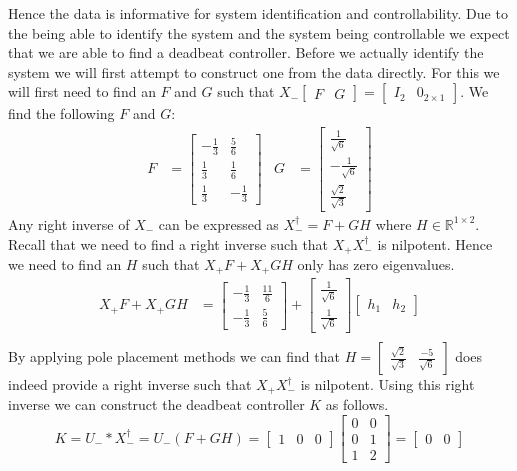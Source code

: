Hence the data is informative for system identification and controllability. Due to the being able to identify the system and the system being controllable we expect that we are able to find a deadbeat controller. Before we actually identify the system we will first attempt to construct one from the data directly. For this we will first need to find an $F$ and $G$ such that $X_- \begin{bmatrix}F&G\end{bmatrix} = \begin{bmatrix}I_2&0_{2\times 1}\end{bmatrix}$. We find the following $F$ and $G$:
\begin{align*}
F &= \begin{bmatrix}
	-\frac{1}{3} & \frac{5}{6} \\ \frac{1}{3} & \frac{1}{6} \\ \frac{1}{3} & -\frac{1}{3}
\end{bmatrix} &
G &= \begin{bmatrix}
	\frac{1}{\sqrt{6}} \\ -\frac{1}{\sqrt{6}} \\ \frac{\sqrt{2}}{\sqrt{3}}
\end{bmatrix}
\end{align*}
Any right inverse of $X_-$ can be expressed as $X_-^\dagger = F + G H$ where $H \in \mathbb{R}^{1 \times 2}$. Recall that we need to find a right inverse such that $X_+ X_-^\dagger$ is nilpotent. Hence we need to find an $H$ such that $X_+ F + X_+ G H$ only has zero eigenvalues. 
\begin{align*}
X_+ F + X_+ G H &= \begin{bmatrix} -\frac{1}{3} & \frac{11}{6} \\ -\frac{1}{3} & \frac{5}{6} \end{bmatrix} + \begin{bmatrix}\frac{1}{\sqrt{6}} \\ \frac{1}{\sqrt{6}}\end{bmatrix} \begin{bmatrix} h_1 & h_2 \end{bmatrix} \\
\end{align*} 
By applying pole placement methods we can find that $H = \begin{bmatrix} \frac{\sqrt{2}}{\sqrt{3}} & \frac{-5}{\sqrt{6}} \end{bmatrix}$ does indeed provide a right inverse such that $X_+ X_-^\dagger$ is nilpotent. Using this right inverse we can construct the deadbeat controller $K$ as follows.
\[ K = U_- * X_-^\dagger = U_- (F + G H) = \begin{bmatrix} 1&0&0 \end{bmatrix} \begin{bmatrix} 0&0\\0&1\\1&2 \end{bmatrix} = \begin{bmatrix} 0&0 \end{bmatrix} \] 

